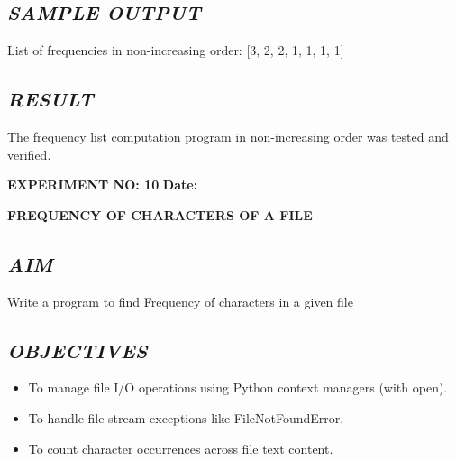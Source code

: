 \documentclass[11pt,a4paper]{article}
\begin{document}
\subsection*{\textit{SAMPLE OUTPUT}}
\begin{tcolorbox}[colback=black!85,colframe=navyblue,title=\textbf{Terminal Output},coltitle=white,fonttitle=\bfseries\small]
\small\ttfamily\color{green!30!white}
List of frequencies in non-increasing order: [3, 2, 2, 1, 1, 1, 1]
\end{tcolorbox}

\subsection*{\textit{RESULT}}
The frequency list computation program in non-increasing order was tested and verified.

\newpage

\noindent
\textbf{\large EXPERIMENT NO: 10} \hfill \textbf{\large Date: \underline{\hspace{3cm}}}

\vspace{0.2cm}
\begin{center}
{\Huge \textbf{\textcolor{navyblue}{FREQUENCY OF CHARACTERS OF A FILE}}}
\end{center}
\vspace{0.3cm}

\subsection*{\textit{AIM}}
Write a program to find Frequency of characters in a given file

\subsection*{\textit{OBJECTIVES}}
\begin{itemize}
  \item To manage file I/O operations using Python context managers (with open).
  \item To handle file stream exceptions like FileNotFoundError.
  \item To count character occurrences across file text content.
\end{itemize}
\end{document}
